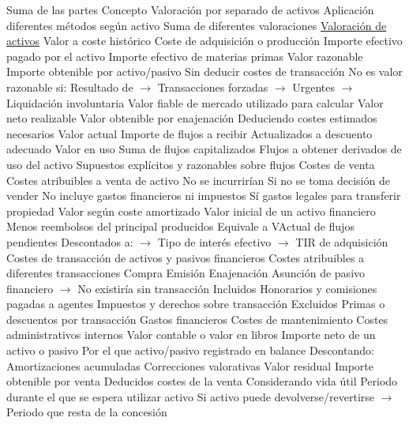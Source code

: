 \documentclass{nuevotema}
\begin{document}
\begin{esquemal}
		\2 Suma de las partes
			\3 Concepto
				\4 Valoración por separado de activos
				\4 Aplicación diferentes métodos según activo
				\4[$\Rightarrow$] Suma de diferentes valoraciones
			\3 \underline{Valoración de activos}
			\3 Valor a coste histórico
				\4 Coste de adquisición o producción
				\4 Importe efectivo pagado por el activo
				\4 Importe efectivo de materias primas
			\3 Valor razonable
				\4 Importe obtenible por activo/pasivo
				\4 Sin deducir costes de transacción
				\4 No es valor razonable si:
				\4[] Resultado de
				\4[] $\to$ Transacciones forzadas
				\4[] $\to$ Urgentes
				\4[] $\to$ Liquidación involuntaria
				\4 Valor fiable de mercado utilizado para calcular
			\3 Valor neto realizable
				\4 Valor obtenible por enajenación
				\4 Deduciendo costes estimados necesarios
			\3 Valor actual
				\4 Importe de flujos a recibir
				\4 Actualizados a descuento adecuado
			\3 Valor en uso
				\4 Suma de flujos capitalizados
				\4 Flujos a obtener derivados de uso del activo
				\4 Supuestos explícitos y razonables sobre flujos
			\3 Costes de venta
				\4 Costes atribuibles a venta de activo
				\4 No se incurrirían
				\4[] Si no se toma decisión de vender
				\4 No incluye gastos financieros ni impuestos
				\4 Sí gastos legales para transferir propiedad
			\3 Valor según coste amortizado
				\4 Valor inicial de un activo financiero
				\4[--] Menos reembolsos del principal producidos
				\4 Equivale a VActual de flujos pendientes
				\4[] Descontados a:
				\4[] $\to$ Tipo de interés efectivo
				\4[] $\to$ TIR de adquisición
			\3 Costes de transacción de activos y pasivos financieros
				\4 Costes atribuibles a diferentes transacciones
				\4[] Compra
				\4[] Emisión
				\4[] Enajenación
				\4[] Asunción de pasivo financiero
				\4[] $\to$ No existiría sin transacción
				\4 Incluidos
				\4[] Honorarios y comisiones pagadas a agentes
				\4[] Impuestos y derechos sobre transacción
				\4 Excluidos
				\4[] Primas o descuentos por transacción
				\4[] Gastos financieros
				\4[] Costes de mantenimiento
				\4[] Costes administrativos internos
			\3 Valor contable o valor en libros
				\4 Importe neto de un activo o pasivo
				\4[] Por el que activo/pasivo registrado en balance
				\4 Descontando:
				\4[] Amortizaciones acumuladas
				\4[] Correcciones valorativas
			\3 Valor residual
				\4 Importe obtenible por venta
				\4 Deducidos costes de la venta
				\4 Considerando vida útil
				\4[] Periodo durante el que se espera utilizar activo
				\4[] Si activo puede devolverse/revertirse
				\4[] $\to$ Periodo que resta de la concesión

\end{esquemal}
\end{document}
